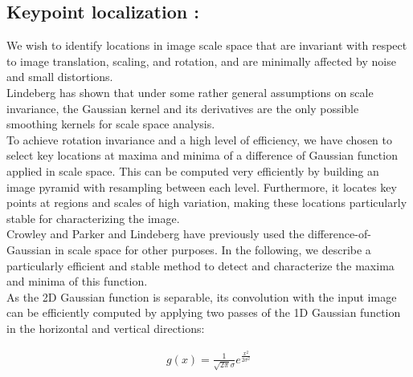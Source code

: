 \subsection{Keypoint localization :}
We wish to identify locations in image scale space that are
invariant with respect to image translation, scaling, and rotation,
and are minimally affected by noise and small distortions.\\
Lindeberg \cite{e} has shown that under some rather
general assumptions on scale invariance, the Gaussian kernel
and its derivatives are the only possible smoothing kernels
for scale space analysis.\\
To achieve rotation invariance and a high level of efficiency,
we have chosen to select key locations at maxima
and minima of a difference of Gaussian function applied in
scale space. This can be computed very efficiently by building
an image pyramid with resampling between each level.
Furthermore, it locates key points at regions and scales of
high variation, making these locations particularly stable for
characterizing the image.\\ Crowley and Parker \cite{f} and Lindeberg
\cite{e} have previously used the difference-of-Gaussian in
scale space for other purposes. In the following, we describe
a particularly efficient and stable method to detect and characterize
the maxima and minima of this function.\\
As the 2D Gaussian function is separable, its convolution
with the input image can be efficiently computed by applying
two passes of the 1D Gaussian function in the horizontal
and vertical directions:

\begin{align}
     g(x)  =\frac{1}{\sqrt{2\pi}\sigma} e^\frac{x^2}{2\sigma^2}
\end{align}


